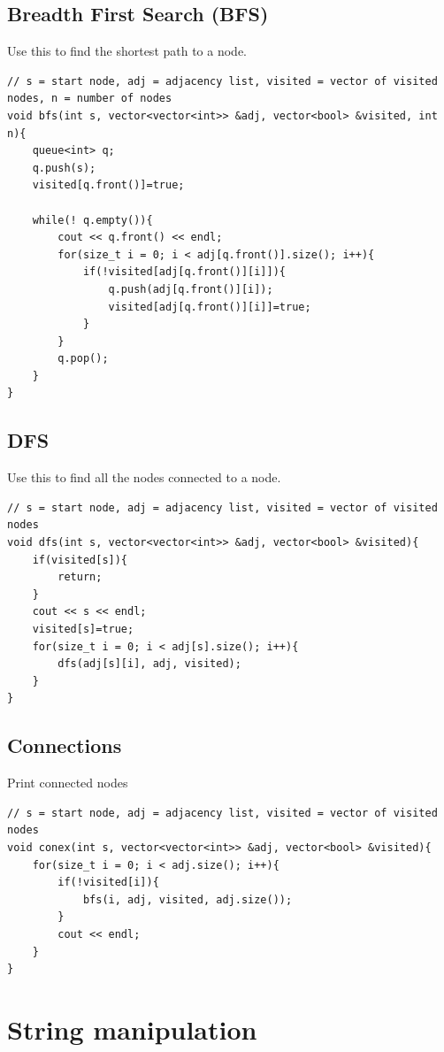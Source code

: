 \documentclass[10pt]{article}
\begin{document}
\begin{multicols*}{2}
\subsection{Breadth First Search (BFS)}
Use this to find the shortest path to a node.
\begin{lstlisting}[style=compactcpp]
// s = start node, adj = adjacency list, visited = vector of visited nodes, n = number of nodes
void bfs(int s, vector<vector<int>> &adj, vector<bool> &visited, int n){
    queue<int> q;
    q.push(s);
    visited[q.front()]=true;

    while(! q.empty()){
        cout << q.front() << endl;
        for(size_t i = 0; i < adj[q.front()].size(); i++){
            if(!visited[adj[q.front()][i]]){
                q.push(adj[q.front()][i]);
                visited[adj[q.front()][i]]=true;
            }
        }
        q.pop();
    }
}
\end{lstlisting}

\subsection{DFS}
Use this to find all the nodes connected to a node.
\begin{lstlisting}[style=compactcpp]
// s = start node, adj = adjacency list, visited = vector of visited nodes
void dfs(int s, vector<vector<int>> &adj, vector<bool> &visited){
    if(visited[s]){
        return;
    }
    cout << s << endl;
    visited[s]=true;
    for(size_t i = 0; i < adj[s].size(); i++){
        dfs(adj[s][i], adj, visited);
    }
}
\end{lstlisting}

\subsection{Connections}
Print connected nodes
\begin{lstlisting}[style=compactcpp]
// s = start node, adj = adjacency list, visited = vector of visited nodes
void conex(int s, vector<vector<int>> &adj, vector<bool> &visited){
    for(size_t i = 0; i < adj.size(); i++){
        if(!visited[i]){
            bfs(i, adj, visited, adj.size());
        }
        cout << endl;
    }
}
\end{lstlisting}

\section{String manipulation}


\end{multicols*}
\end{document}
